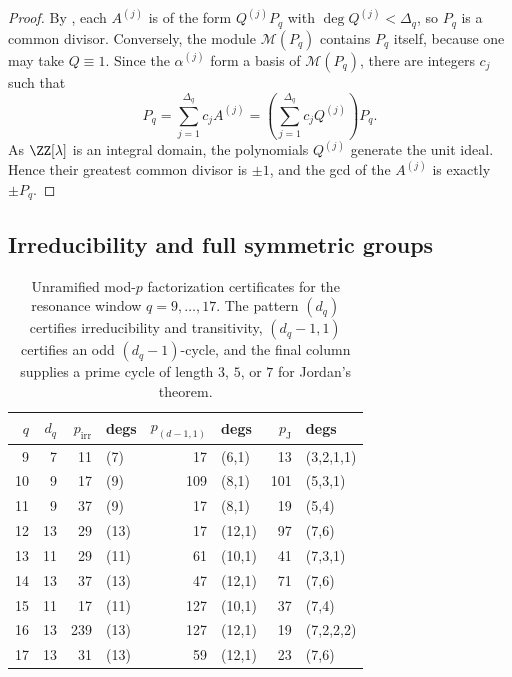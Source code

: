 \begin{proof}
By , each \(A^{(j)}\) is of the form
\(Q^{(j)}P_q\) with \(\deg Q^{(j)}<\Delta_q\), so \(P_q\) is a common divisor.
Conversely, the module \(\mathcal M(P_q)\) contains \(P_q\) itself, because one
may take \(Q\equiv 1\).  Since the \(\alpha^{(j)}\) form a basis of
\(\mathcal M(P_q)\), there are integers \(c_j\) such that
\[
  P_q=\sum_{j=1}^{\Delta_q} c_j A^{(j)}
  =\left(\sum_{j=1}^{\Delta_q} c_jQ^{(j)}\right)P_q.
\]
As \(\ZZ[\lambda]\) is an integral domain, the polynomials \(Q^{(j)}\) generate
the unit ideal.  Hence their greatest common divisor is \(\pm1\), and the gcd of
the \(A^{(j)}\) is exactly \(\pm P_q\).
\end{proof}

\subsection{Irreducibility and full symmetric groups}

\begin{table}[t]
\centering
\scriptsize
\setlength{\tabcolsep}{5pt}
\caption{Unramified mod-\(p\) factorization certificates for the resonance
window \(q=9,\dots,17\).  The pattern \((d_q)\) certifies irreducibility and
transitivity, \((d_q-1,1)\) certifies an odd \((d_q-1)\)-cycle, and the final
column supplies a prime cycle of length \(3\), \(5\), or \(7\) for Jordan's
theorem.}
\label{tab:galois-certificates-q9-17}
\begin{tabular}{r r r l r l r l}
\toprule
\(q\) & \(d_q\) & \(p_{\mathrm{irr}}\) & degs & \(p_{(d-1,1)}\) & degs & \(p_{\mathrm{J}}\) & degs\\
\midrule
9  & 7  & 11  & (7)  & 17  & (6,1)   & 13 & (3,2,1,1) \\
10 & 9  & 17  & (9)  & 109 & (8,1)   & 101 & (5,3,1) \\
11 & 9  & 37  & (9)  & 17  & (8,1)   & 19 & (5,4) \\
12 & 13 & 29  & (13) & 17  & (12,1)  & 97 & (7,6) \\
13 & 11 & 29  & (11) & 61  & (10,1)  & 41 & (7,3,1) \\
14 & 13 & 37  & (13) & 47  & (12,1)  & 71 & (7,6) \\
15 & 11 & 17  & (11) & 127 & (10,1)  & 37 & (7,4) \\
16 & 13 & 239 & (13) & 127 & (12,1)  & 19 & (7,2,2,2) \\
17 & 13 & 31  & (13) & 59  & (12,1)  & 23 & (7,6) \\
\bottomrule
\end{tabular}
\end{table}

